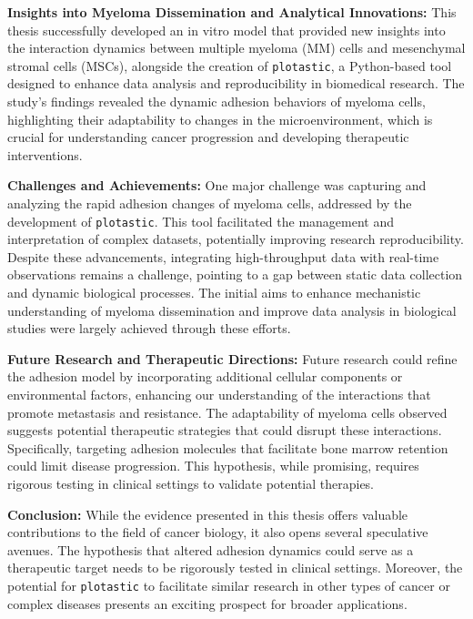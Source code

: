 

%
\label{sec:discussion_overall_conclusion}%
%
\textbf{Insights into Myeloma Dissemination and Analytical Innovations:}
This thesis successfully developed an in vitro model that provided new insights
into the interaction dynamics between multiple myeloma (MM) cells and
mesenchymal stromal cells (MSCs), alongside the creation of \texttt{plotastic},
a Python-based tool designed to enhance data analysis and reproducibility in
biomedical research. The study's findings revealed the dynamic adhesion
behaviors of myeloma cells, highlighting their adaptability to changes in the
microenvironment, which is crucial for understanding cancer progression and
developing therapeutic interventions.

\textbf{Challenges and Achievements:}
One major challenge was capturing and analyzing the rapid adhesion changes of
myeloma cells, addressed by the development of \texttt{plotastic}. This tool
facilitated the management and interpretation of complex datasets, potentially
improving research reproducibility. Despite these advancements, integrating
high-throughput data with real-time observations remains a challenge, pointing
to a gap between static data collection and dynamic biological processes. The
initial aims to enhance mechanistic understanding of myeloma dissemination and
improve data analysis in biological studies were largely achieved through these
efforts.

\textbf{Future Research and Therapeutic Directions:}
Future research could refine the adhesion model by incorporating additional
cellular components or environmental factors, enhancing our understanding of the
interactions that promote metastasis and resistance. The adaptability of myeloma
cells observed suggests potential therapeutic strategies that could disrupt
these interactions. Specifically, targeting adhesion molecules that facilitate
bone marrow retention could limit disease progression. This hypothesis,
while promising, requires rigorous testing in clinical settings to validate
potential therapies.

\textbf{Conclusion:}
While the evidence presented in this thesis offers valuable contributions to the
field of cancer biology, it also opens several speculative avenues. The
hypothesis that altered adhesion dynamics could serve as a therapeutic target
needs to be rigorously tested in clinical settings. Moreover, the potential for
\texttt{plotastic} to facilitate similar research in other types of cancer or complex
diseases presents an exciting prospect for broader applications.

